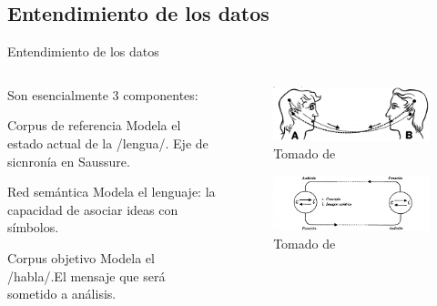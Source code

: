 \documentclass[presentation]{beamer}
\begin{document}
\subsection{Entendimiento de los datos}
\label{sec:orgd14d084}
\begin{frame}[label={sec:org65b1151}]{Entendimiento de los datos}
\begin{columns}
\begin{column}{0.48\columnwidth}
Son esencialmente 3 componentes:

\begin{block}{Corpus de referencia}
Modela el estado actual de la /lengua/.
Eje de sicnronía en Saussure.
\end{block}

\begin{block}{Red semántica}
 Modela el lenguaje: la capacidad de asociar ideas con símbolos.
\end{block}

\begin{block}{Corpus objetivo}
 Modela el /habla/.El mensaje que será sometido a análisis.
\end{block}
\end{column}



\begin{column}{0.48\columnwidth}
\begin{figure}
\includegraphics[width=\textwidth]{./assets/sistema-comunicacion.png}
\caption{Tomado de \cite{alonso1945curso}}
\end{figure}

   \begin{figure}

   \includegraphics[width=\textwidth]{./assets/sistema-comunicacion2.png}
\caption{Tomado de \cite{alonso1945curso}}
   \end{figure}
\end{column}
\end{columns}
\end{frame}
\end{document}
